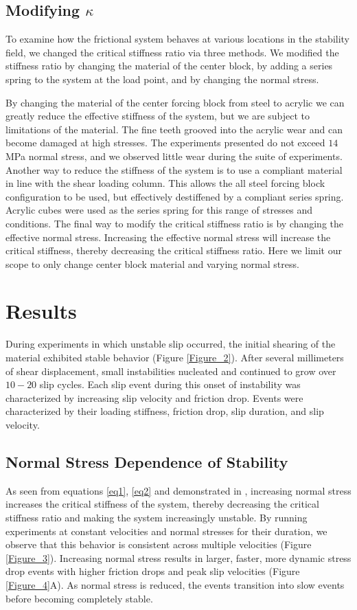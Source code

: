 \subsection{Modifying $\kappa$}
To examine how the frictional system behaves at various locations in the stability field, we changed the critical stiffness ratio via three methods. We modified the stiffness ratio by changing the material of the center block, by adding a series spring to the system at the load point, and by changing the normal stress.

By changing the material of the center forcing block from steel to acrylic we can greatly reduce the effective stiffness of the system, but we are subject to limitations of the material. The fine teeth grooved into the acrylic wear and can become damaged at high stresses. The experiments presented do not exceed $14$ MPa normal stress, and we observed little wear during the suite of experiments. Another way to reduce the stiffness of the system is to use a compliant material in line with the shear loading column. This allows the all steel forcing block configuration to be used, but effectively destiffened by a compliant series spring. Acrylic cubes were used as the series spring for this range of stresses and conditions. The final way to modify the critical stiffness ratio is by changing the effective normal stress. Increasing the effective normal stress will increase the critical stiffness, thereby decreasing the critical stiffness ratio. Here we limit our scope to only change center block material and varying normal stress.

\section{Results}
During experiments in which unstable slip occurred, the initial shearing of the material exhibited stable behavior (Figure \ref{Figure_2}). After several millimeters of shear displacement, small instabilities nucleated and continued to grow over $10-20$ slip cycles. Each slip event during this onset of instability was characterized by increasing slip velocity and friction drop. Events were characterized by their loading stiffness, friction drop, slip duration, and slip velocity.

\subsection{Normal Stress Dependence of Stability}
	As seen from equations \ref{eq1}, \ref{eq2} and demonstrated in \cite{leeman2015stiffness,leeman2016laboratory}, increasing normal stress increases the critical stiffness of the system, thereby decreasing the critical stiffness ratio and making the system increasingly unstable. By running experiments at constant velocities and normal stresses for their duration, we observe that this behavior is consistent across multiple velocities (Figure \ref{Figure_3}). Increasing normal stress results in larger, faster, more dynamic stress drop events with higher friction drops and peak slip velocities (Figure \ref{Figure_4}A). As normal stress is reduced, the events transition into slow events before becoming completely stable. 

